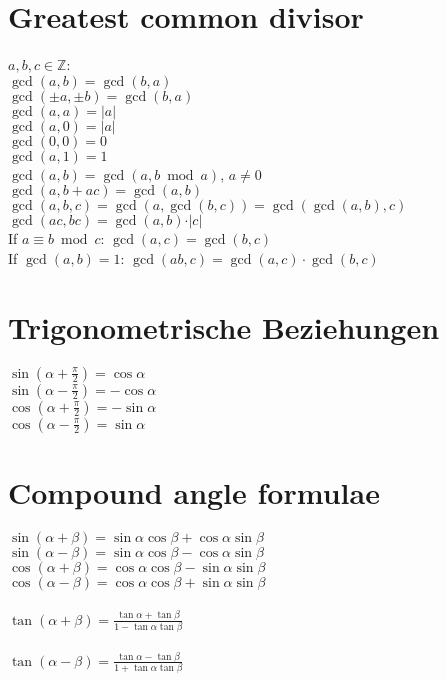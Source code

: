 \documentclass[a4paper, 10pt]{scrartcl}
\begin{document}
\section*{Greatest common divisor}
$a, b, c\in \mathbb{Z}$:\\
$\gcd(a, b) = \gcd(b, a)$\\
$\gcd(\pm a, \pm b) = \gcd(b, a)$\\
$\gcd(a, a) = \vert a\vert$\\
$\gcd(a, 0) = \vert a\vert$\\
$\gcd(0, 0) = 0$\\
$\gcd(a, 1) = 1$\\
$\gcd(a, b) = \gcd(a, b\bmod a)$, $a\neq 0$\\
$\gcd(a, b + ac) = \gcd(a, b)$\\
$\gcd(a, b, c) = \gcd(a, \gcd(b, c)) = \gcd(\gcd(a, b), c)$\\
$\gcd(ac, bc) = \gcd(a, b)\cdot\vert c\vert$\\
If $a\equiv b\bmod c$: $\gcd(a, c) = \gcd(b, c)$\\
If $\gcd(a, b) = 1$: $\gcd(ab, c) = \gcd(a, c)\cdot\gcd(b, c)$\\

\section*{Trigonometrische Beziehungen}
$\sin{(\alpha + \frac{\pi}{2})} = \cos{\alpha}$\\
$\sin{(\alpha - \frac{\pi}{2})} = -\cos{\alpha}$\\
$\cos{(\alpha + \frac{\pi}{2})} = -\sin{\alpha}$\\
$\cos{(\alpha - \frac{\pi}{2})} = \sin{\alpha}$\\

\section*{Compound angle formulae}
$\sin{(\alpha + \beta)} = \sin{\alpha}\cos{\beta} + \cos{\alpha}\sin{\beta}$\\
$\sin{(\alpha - \beta)} = \sin{\alpha}\cos{\beta} - \cos{\alpha}\sin{\beta}$\\
$\cos{(\alpha + \beta)} = \cos{\alpha}\cos{\beta} - \sin{\alpha}\sin{\beta}$\\
$\cos{(\alpha - \beta)} = \cos{\alpha}\cos{\beta} + \sin{\alpha}\sin{\beta}$\\\\
$\tan{(\alpha + \beta)} = \frac{\tan{\alpha} + \tan{\beta}}{1 - \tan{\alpha}\tan{\beta}}$\\\\
$\tan{(\alpha - \beta)} = \frac{\tan{\alpha} - \tan{\beta}}{1 + \tan{\alpha}\tan{\beta}}$\\
\end{document}
